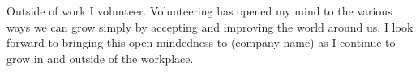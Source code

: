 Outside of work I volunteer. Volunteering has opened my mind to the various ways we can grow simply by accepting and improving the world around us. I look forward to bringing this open-mindedness to (company name) as I continue to grow in and outside of the workplace.
